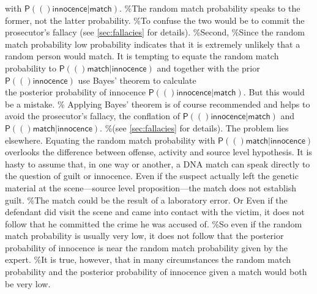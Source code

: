 \documentclass[10pt,dvipsnames,enabledeprecatedfontcommands]{scrartcl}
\newcommand{\pr}[1]{\mathsf{P}(#1)}
\begin{document}
with \(\pr(\textsf{innocence} \vert \textsf{match})\). \%The random
match probability speaks to the former, not the latter probability. \%To
confuse the two would be to commit the prosecutor's fallacy (see
\ref{sec:fallacies} for details). \%Second, \%Since the random match
probability low probability indicates that it is extremely unlikely that
a random person would match. It is tempting to equate the random match
probability to \(\pr(\textsf{match} \vert \textsf{innocence})\) and
together with the prior \(\pr(\textsf{innocence})\) use Bayes' theorem
to calculate\\
the posterior probability of innocence
\(\pr(\textsf{innocence} \vert \textsf{match})\). But this would be a
mistake. \% Applying Bayes' theorem is of course recommended and helps
to avoid the prosecutor's fallacy, the conflation of
\(\pr(\textsf{innocence} \vert \textsf{match})\) and
\(\pr(\textsf{match} \vert \textsf{innocence})\). \%(see
\ref{sec:fallacies} for details). The problem lies elsewhere. Equating
the random match probability with
\(\pr(\textsf{match} \vert \textsf{innocence})\) overlooks the
difference between offense, activity and source level hypothesis. It is
hasty to assume that, in one way or another, a DNA match can speak
directly to the question of guilt or innocence. Even if the suspect
actually left the genetic material at the scene---source level
proposition---the match does not establish guilt. \%The match could be
the result of a laboratory error. Or Even if the defendant did visit the
scene and came into contact with the victim, it does not follow that he
committed the crime he was accused of. \%So even if the random match
probability is usually very low, it does not follow that the posterior
probability of innocence is near the random match probability given by
the expert. \%It is true, however, that in many circumstances the random
match probability and the posterior probability of innocence given a
match would both be very low.
\end{document}
